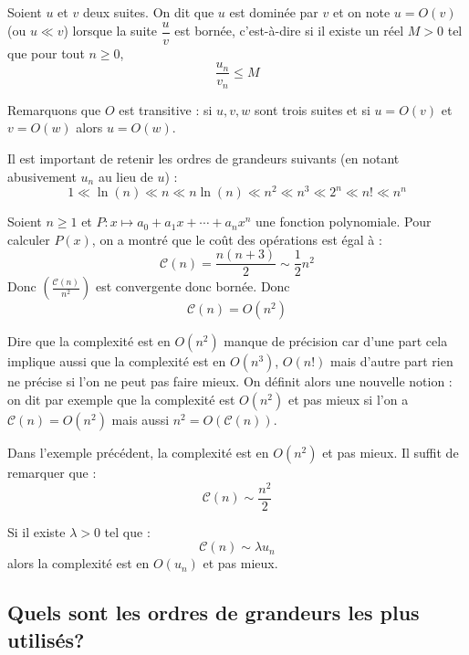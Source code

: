\documentclass[french,11pt,twoside]{VcCours}
\begin{document}
\begin{Definition}{} Soient $u$ et $v$ deux suites. 
    On dit que $u$ est dominée par $v$ et on note $u=O(v)$ (ou $u\ll v$) 
    lorsque la suite $\dfrac{u}{v}$ est bornée, c'est-à-dire si il existe 
    un réel $M>0$ tel que pour tout $n \geq 0$,
    $$ \frac{u_n}{v_n} \leq M$$
\end{Definition} 

Remarquons que $O$ est transitive : si $u,v,w$ sont trois suites 
et si $u=O(v)$ et $v=O(w)$ alors $u=O(w)$.

\medskip

Il est important de retenir les ordres de grandeurs suivants (en notant abusivement $u_n$ au lieu de $u$) : 
$$ 1\ll \ln(n) \ll n \ll n \ln(n) \ll n^2 \ll n^3 \ll 2^n \ll n! \ll n^n$$

\begin{Exercice}{} Soient $n \geq 1$ et $P : x \mapsto a_0 + a_1 x + \cdots + a_n x^n$ une fonction polynomiale. Pour calculer $P(x)$, on a montré que le coût des opérations est égal à :
$$\mathcal{C}(n)=\frac{n(n+3)}{2} \sim \frac{1}{2}n^2$$
Donc $\left(\frac{\mathcal{C}(n)}{n^2} \right)$ est convergente donc bornée.
Donc
$$ \mathcal{C}(n) = O(n^2)$$
\end{Exercice}

\vspace{-1em}
\begin{Remarque}{} Dire que la complexité est en $O(n^2)$ manque de précision 
    car d'une part cela implique aussi que la complexité est en $O(n^3)$, 
    $O(n!)$ mais d'autre part rien ne précise si l'on ne peut pas faire mieux. 
    On définit alors une nouvelle notion : on dit par exemple que la complexité 
    est $O(n^2)$ \og et pas mieux \fg{} si l'on a $\mathcal{C}(n)=O(n^2)$ mais 
    aussi $n^2 = O(\mathcal{C}(n))$.
\end{Remarque}

\begin{Exercice}{} Dans l'exemple précédent, la complexité est en $O(n^2)$ et pas mieux. Il suffit de remarquer que :
$$ \mathcal{C}(n) \sim \frac{n^2}{2}$$
\end{Exercice}

\vspace{-1em}
\begin{Remarque}{} Si il existe $\lambda >0$ tel que :
$$ \mathcal{C}(n) \sim \lambda u_n$$
alors la complexité est en $O(u_n)$ et pas mieux.
\end{Remarque}

\subsection{Quels sont les ordres de grandeurs les plus utilisés?}
\end{document}
